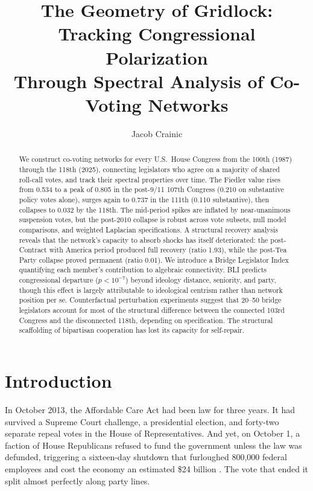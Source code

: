 \documentclass[12pt, a4paper]{article}
\title{\textbf{The Geometry of Gridlock: Tracking Congressional Polarization\\ Through Spectral Analysis of Co-Voting Networks}}
\author{Jacob Crainic}
\date{}
\begin{document}
\raggedbottom

\maketitle

\begin{abstract}
We construct co-voting networks for every U.S.\ House Congress from the 100th (1987) through the 118th (2025), connecting legislators who agree on a majority of shared roll-call votes, and track their spectral properties over time. The Fiedler value rises from 0.534 to a peak of 0.805 in the post-9/11 107th Congress (0.210 on substantive policy votes alone), surges again to 0.737 in the 111th (0.110 substantive), then collapses to 0.032 by the 118th. The mid-period spikes are inflated by near-unanimous suspension votes, but the post-2010 collapse is robust across vote subsets, null model comparisons, and weighted Laplacian specifications. A structural recovery analysis reveals that the network's capacity to absorb shocks has itself deteriorated: the post-Contract with America period produced full recovery (ratio 1.93), while the post-Tea Party collapse proved permanent (ratio 0.01). We introduce a Bridge Legislator Index quantifying each member's contribution to algebraic connectivity. BLI predicts congressional departure ($p < 10^{-7}$) beyond ideology distance, seniority, and party, though this effect is largely attributable to ideological centrism rather than network position per se. Counterfactual perturbation experiments suggest that 20--50 bridge legislators account for most of the structural difference between the connected 103rd Congress and the disconnected 118th, depending on specification. The structural scaffolding of bipartisan cooperation has lost its capacity for self-repair.
\end{abstract}

\section{Introduction}

In October 2013, the Affordable Care Act had been law for three years. It had survived a Supreme Court challenge, a presidential election, and forty-two separate repeal votes in the House of Representatives. And yet, on October 1, a faction of House Republicans refused to fund the government unless the law was defunded, triggering a sixteen-day shutdown that furloughed 800,000 federal employees and cost the economy an estimated \$24 billion \citep{cbo2013}. The vote that ended it split almost perfectly along party lines.
\end{document}

